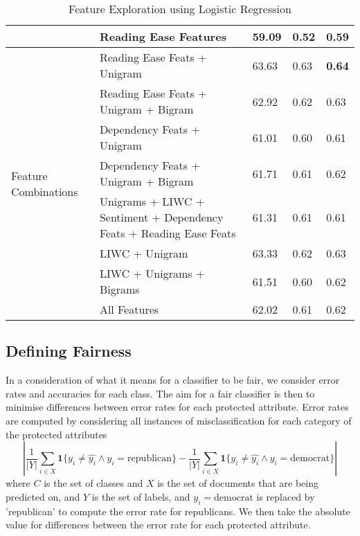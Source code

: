 \begin{table*}[ht]
{\begin{tabular}{l|l|lll}
                                            & Reading Ease Features                                               & 59.09      & 0.52      & 0.59   \\\hline
  \multirow{8}{*}{Feature Combinations}     & Reading Ease Feats + Unigram                                        & 63.63      & 0.63      & \bf{0.64}\\
                                            & Reading Ease Feats + Unigram + Bigram                               & 62.92      & 0.62      & 0.63   \\
                                            & Dependency Feats + Unigram                                          & 61.01      & 0.60      & 0.61   \\
                                            & Dependency Feats + Unigram + Bigram                                 & 61.71      & 0.61      & 0.62   \\
                                            & Unigrams + LIWC + Sentiment + Dependency Feats + Reading Ease Feats & 61.31      & 0.61      & 0.61   \\
                                            & LIWC + Unigram                                                      & 63.33      & 0.62      & 0.63   \\
                                            & LIWC + Unigrams + Bigrams                                           & 61.51      & 0.60      & 0.62   \\
                                            & All Features                                                        & 62.02      & 0.61      & 0.62
\end{tabular}%
}
\caption{Feature Exploration using Logistic Regression}
\label{tab:feat_exploration}
\end{table*}

\subsection{Defining Fairness}

In a consideration of what it means for a classifier to be fair, we consider error rates and accuracies for each class. The aim for a fair classifier is then to minimise differences between error rates for each protected attribute.
Error rates are computed by considering all instances of misclassification for each category of the protected attributes
\begin{equation}
  \left|\dfrac{1}{|Y|}\sum_{i\in X} \mathbf{1}\{y_i \neq \hat{y_i} \land y_i = \text{republican}\} - \dfrac{1}{|Y|}\sum_{i\in X} \mathbf{1}\{y_i \neq \hat{y_i} \land y_i = \text{democrat}\}\right|
  \label{eq:err_rate}
\end{equation}
where $C$ is the set of classes and $X$ is the set of documents that are being predicted on, and $Y$ is the set of labels, and $y_i = \text{democrat}$ is replaced by 'republican' to compute the error rate for republicans. We then take the absolute value for differences between the error rate for each protected attribute.

